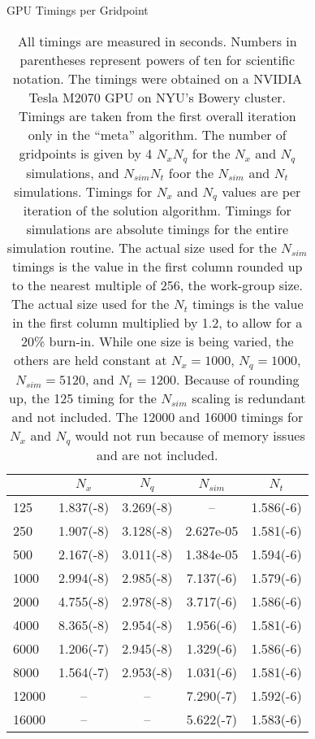 \documentclass[a4paper,12pt]{article}
\numberwithin{equation}{section}
\theoremstyle{definition}
\begin{document}
\begin{table}[ht]
  \centering
  \caption{GPU Timings per Gridpoint}
  \label{tab:timings_pergrid}
  \begin{tabular}{l c c c c}
    \toprule
    & $N_x$ & $N_q$ & $N_{sim}$ & $N_t$ \\
    \midrule
    125 & 1.837(-8) & 3.269(-8) &  -- & 1.586(-6) \\
    250 & 1.907(-8) & 3.128(-8) & 2.627e-05 & 1.581(-6) \\
    500 & 2.167(-8) & 3.011(-8) & 1.384e-05 & 1.594(-6) \\
    1000 & 2.994(-8) & 2.985(-8) & 7.137(-6) & 1.579(-6) \\
    2000 & 4.755(-8) & 2.978(-8) & 3.717(-6) & 1.586(-6) \\
    4000 & 8.365(-8) & 2.954(-8) & 1.956(-6) & 1.581(-6) \\
    6000 & 1.206(-7) & 2.945(-8) & 1.329(-6) & 1.586(-6) \\
    8000 & 1.564(-7) & 2.953(-8) & 1.031(-6) & 1.581(-6) \\
    12000 &  -- &  -- & 7.290(-7) & 1.592(-6) \\
    16000 &  -- &  -- & 5.622(-7) & 1.583(-6) \\
    \bottomrule
  \end{tabular}
  \caption*{\footnotesize All timings are measured in seconds. Numbers in parentheses represent powers of ten for scientific notation. The timings were obtained on a NVIDIA Tesla M2070 GPU on NYU's Bowery cluster. Timings are taken from the first overall iteration only in the ``meta'' algorithm. The number of gridpoints is given by 4 $N_x N_q$ for the $N_x$ and $N_q$ simulations, and $N_{sim} N_t$ foor the $N_{sim}$ and $N_t$ simulations. Timings for $N_x$ and $N_q$ values are per iteration of the solution algorithm. Timings for simulations are absolute timings for the entire simulation routine. The actual size used for the $N_{sim}$ timings is the value in the first column rounded up to the nearest multiple of 256, the work-group size. The actual size used for the $N_t$ timings is the value in the first column multiplied by 1.2, to allow for a 20\% burn-in. While one size is being varied, the others are held constant at $N_x = 1000$, $N_q = 1000$, $N_{sim} = 5120$, and $N_t = 1200$. Because of rounding up, the 125 timing for the $N_{sim}$ scaling is redundant and not included. The 12000 and 16000 timings for $N_x$ and $N_q$ would not run because of memory issues and are not included.}
\end{table}
\end{document}
